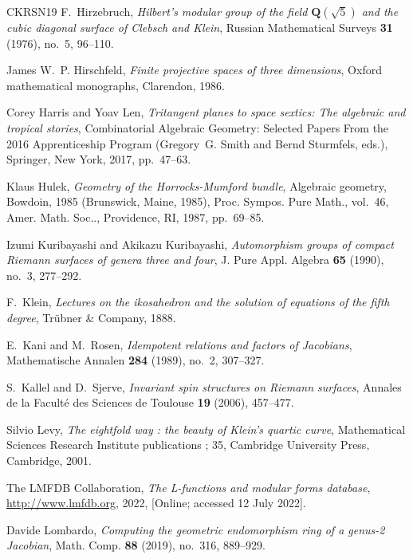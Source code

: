 \documentclass{amsart}
\begin{document}
\begin{thebibliography}{CKRSN19}
F.~Hirzebruch, \emph{Hilbert's modular group of the field $ \mathbf {Q}(\sqrt
  5)$ and the cubic diagonal surface of {C}lebsch and {K}lein}, Russian
  Mathematical Surveys \textbf{31} (1976), no.~5, 96--110.

James W.~P. Hirschfeld, \emph{Finite projective spaces of three dimensions},
  Oxford mathematical monographs, Clarendon, 1986.

Corey Harris and Yoav Len, \emph{Tritangent planes to space sextics: The
  algebraic and tropical stories}, Combinatorial Algebraic Geometry: Selected
  Papers From the 2016 Apprenticeship Program (Gregory~G. Smith and Bernd
  Sturmfels, eds.), Springer, New York, 2017, pp.~47--63.

Klaus Hulek, \emph{Geometry of the {H}orrocks-{M}umford bundle}, Algebraic
  geometry, {B}owdoin, 1985 ({B}runswick, {M}aine, 1985), Proc. Sympos. Pure
  Math., vol.~46, Amer. Math. Soc.., Providence, RI, 1987, pp.~69--85.

Izumi Kuribayashi and Akikazu Kuribayashi, \emph{Automorphism groups of compact
  {R}iemann surfaces of genera three and four}, J. Pure Appl. Algebra
  \textbf{65} (1990), no.~3, 277--292.

F.~Klein, \emph{Lectures on the ikosahedron and the solution of equations of
  the fifth degree}, Tr{\"u}bner \& Company, 1888.

E.~Kani and M.~Rosen, \emph{Idempotent relations and factors of {J}acobians},
  Mathematische Annalen \textbf{284} (1989), no.~2, 307--327.

S.~Kallel and D.~Sjerve, \emph{Invariant spin structures on {R}iemann
  surfaces}, Annales de la Facult{\'e} des Sciences de Toulouse \textbf{19}
  (2006), 457--477.

Silvio Levy, \emph{The eightfold way : the beauty of {K}lein's quartic curve},
  Mathematical Sciences Research Institute publications ; 35, Cambridge
  University Press, Cambridge, 2001.

The {LMFDB Collaboration}, \emph{The {L}-functions and modular forms database},
  \url{http://www.lmfdb.org}, 2022, [Online; accessed 12 July 2022].

Davide Lombardo, \emph{Computing the geometric endomorphism ring of a genus-2
  {J}acobian}, Math. Comp. \textbf{88} (2019), no.~316, 889--929.


\end{thebibliography}
\end{document}
